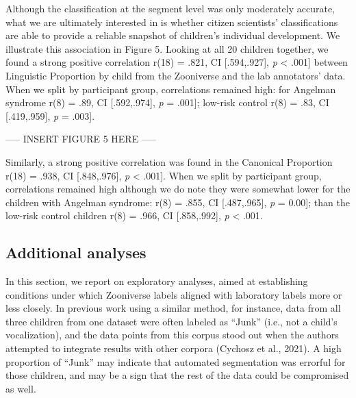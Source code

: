 \documentclass[english,,man]{apa6}
\begin{document}
Although the classification at the segment level was only moderately accurate, what we are ultimately interested in is whether citizen scientists' classifications are able to provide a reliable snapshot of children's individual development. We illustrate this association in Figure 5. Looking at all 20 children together, we found a strong positive correlation r(18) = .821, CI {[}.594,.927{]}, \emph{p} \textless{} .001{]} between Linguistic Proportion by child from the Zooniverse and the lab annotators' data. When we split by participant group, correlations remained high: for Angelman syndrome r(8) = .89, CI {[}.592,.974{]}, \emph{p} = .001{]}; low-risk control r(8) = .83, CI {[}.419,.959{]}, \emph{p} = .003{]}.

----- INSERT FIGURE 5 HERE -----

Similarly, a strong positive correlation was found in the Canonical Proportion r(18) = .938, CI {[}.848,.976{]}, \emph{p} \textless{} .001{]}. When we split by participant group, correlations remained high although we do note they were somewhat lower for the children with Angelman syndrome: r(8) = .855, CI {[}.487,.965{]}, \emph{p} = 0.00{]}; than the low-risk control children r(8) = .966, CI {[}.858,.992{]}, \emph{p} \textless{} .001.

\hypertarget{additional-analyses}{%
\subsection{Additional analyses}\label{additional-analyses}}

In this section, we report on exploratory analyses, aimed at establishing conditions under which Zooniverse labels aligned with laboratory labels more or less closely. In previous work using a similar method, for instance, data from all three children from one dataset were often labeled as \enquote{Junk} (i.e., not a child's vocalization), and the data points from this corpus stood out when the authors attempted to integrate results with other corpora (Cychosz et al., 2021). A high proportion of \enquote{Junk} may indicate that automated segmentation was errorful for those children, and may be a sign that the rest of the data could be compromised as well.
\end{document}

